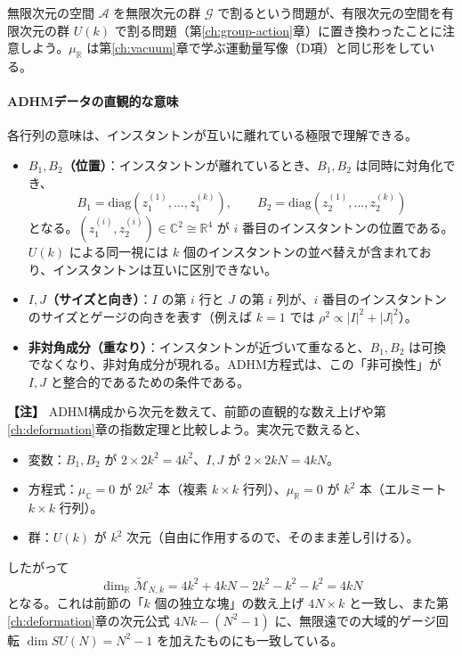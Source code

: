 \documentclass[uplatex, dvipdfmx, book]{jsbook}
\newenvironment{note}{\vspace{1ex}\par\footnotesize\noindent\textbf{【注】}}{\par\vspace{1ex}}
\begin{document}
無限次元の空間 $\mathcal{A}$ を無限次元の群 $\mathcal{G}$ で割るという問題が、有限次元の空間を有限次元の群 $U(k)$ で割る問題（第\ref{ch:group-action}章）に置き換わったことに注意しよう。$\mu_{\mathbb{R}}$ は第\ref{ch:vacuum}章で学ぶ運動量写像（D項）と同じ形をしている。

\paragraph{ADHMデータの直観的な意味}
各行列の意味は、インスタントンが互いに離れている極限で理解できる。
\begin{itemize}
    \item \textbf{$B_1, B_2$（位置）}：インスタントンが離れているとき、$B_1, B_2$ は同時に対角化でき、
    \begin{equation*}
        B_1 = \mathrm{diag}(z_1^{(1)}, \dots, z_1^{(k)}), \qquad B_2 = \mathrm{diag}(z_2^{(1)}, \dots, z_2^{(k)})
    \end{equation*}
    となる。$(z_1^{(i)}, z_2^{(i)}) \in \mathbb{C}^2 \cong \mathbb{R}^4$ が $i$ 番目のインスタントンの位置である。$U(k)$ による同一視には $k$ 個のインスタントンの並べ替えが含まれており、インスタントンは互いに区別できない。
    \item \textbf{$I, J$（サイズと向き）}：$I$ の第 $i$ 行と $J$ の第 $i$ 列が、$i$ 番目のインスタントンのサイズとゲージの向きを表す（例えば $k = 1$ では $\rho^2 \propto |I|^2 + |J|^2$）。
    \item \textbf{非対角成分（重なり）}：インスタントンが近づいて重なると、$B_1, B_2$ は可換でなくなり、非対角成分が現れる。ADHM方程式は、この「非可換性」が $I, J$ と整合的であるための条件である。
\end{itemize}

\begin{note}
ADHM構成から次元を数えて、前節の直観的な数え上げや第\ref{ch:deformation}章の指数定理と比較しよう。実次元で数えると、
\begin{itemize}
    \item 変数：$B_1, B_2$ が $2 \times 2k^2 = 4k^2$、$I, J$ が $2 \times 2kN = 4kN$。
    \item 方程式：$\mu_{\mathbb{C}} = 0$ が $2k^2$ 本（複素 $k \times k$ 行列）、$\mu_{\mathbb{R}} = 0$ が $k^2$ 本（エルミート $k \times k$ 行列）。
    \item 群：$U(k)$ が $k^2$ 次元（自由に作用するので、そのまま差し引ける）。
\end{itemize}
したがって
\begin{equation*}
    \dim_{\mathbb{R}} \widetilde{\mathcal{M}}_{N,k} = 4k^2 + 4kN - 2k^2 - k^2 - k^2 = 4kN
\end{equation*}
となる。これは前節の「$k$ 個の独立な塊」の数え上げ $4N \times k$ と一致し、また第\ref{ch:deformation}章の次元公式 $4Nk - (N^2 - 1)$ に、無限遠での大域的ゲージ回転 $\dim SU(N) = N^2 - 1$ を加えたものにも一致している。
\end{note}
\end{document}
